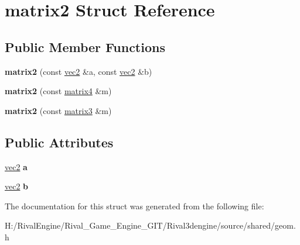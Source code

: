 \hypertarget{structmatrix2}{}\section{matrix2 Struct Reference}
\label{structmatrix2}
\subsection*{Public Member Functions}
\begin{DoxyCompactItemize}
\item 
\mbox{\label{structmatrix2_a0e31b56e3f594156443a08005bbfea97}} 
{\bfseries matrix2} (const \hyperlink{structvec2}{vec2} \&a, const \hyperlink{structvec2}{vec2} \&b)
\item 
\mbox{\label{structmatrix2_a85a0da9192530cfc64fe834ca7330d51}} 
{\bfseries matrix2} (const \hyperlink{structmatrix4}{matrix4} \&m)
\item 
\mbox{\label{structmatrix2_ab7f178a7ca8320c53b76729fd9b91c02}} 
{\bfseries matrix2} (const \hyperlink{structmatrix3}{matrix3} \&m)
\end{DoxyCompactItemize}
\subsection*{Public Attributes}
\begin{DoxyCompactItemize}
\item 
\mbox{\label{structmatrix2_a348b7bbfeaf26d73eee48f632d25621d}} 
\hyperlink{structvec2}{vec2} {\bfseries a}
\item 
\mbox{\label{structmatrix2_a6c0fe616fe7f552edce1771d3ca00aca}} 
\hyperlink{structvec2}{vec2} {\bfseries b}
\end{DoxyCompactItemize}


The documentation for this struct was generated from the following file\+:\begin{DoxyCompactItemize}
\item 
H\+:/\+Rival\+Engine/\+Rival\+\_\+\+Game\+\_\+\+Engine\+\_\+\+G\+I\+T/\+Rival3dengine/source/shared/geom.\+h\end{DoxyCompactItemize}
